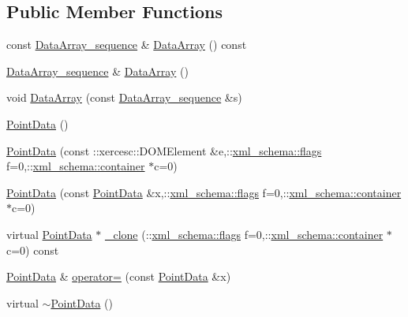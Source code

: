 \subsection*{Public Member Functions}
\begin{DoxyCompactItemize}
\item 
const \hyperlink{classPointData_acd882fa412789571fcaa2599ad2b2c71}{Data\+Array\+\_\+sequence} \& \hyperlink{classPointData_ac4d75ba2976d6acdaceb0b69f574e895}{Data\+Array} () const 
\item 
\hyperlink{classPointData_acd882fa412789571fcaa2599ad2b2c71}{Data\+Array\+\_\+sequence} \& \hyperlink{classPointData_aa8ff7ad5b2c1d99794d4b96e481138d2}{Data\+Array} ()
\item 
void \hyperlink{classPointData_a207059b73203faf8b3fec8659a9104e5}{Data\+Array} (const \hyperlink{classPointData_acd882fa412789571fcaa2599ad2b2c71}{Data\+Array\+\_\+sequence} \&s)
\item 
\hyperlink{classPointData_add74ef42ae2c48850449cd59e216111f}{Point\+Data} ()
\item 
\hyperlink{classPointData_ae0d2a9251b2690a28a04a96105874e45}{Point\+Data} (const \+::xercesc\+::\+D\+O\+M\+Element \&e,\+::\hyperlink{namespacexml__schema_a0612287d030cb2732d31a45b258fdc87}{xml\+\_\+schema\+::flags} f=0,\+::\hyperlink{namespacexml__schema_ada9aa30dc722e93ee2ed7243085402a5}{xml\+\_\+schema\+::container} $\ast$c=0)
\item 
\hyperlink{classPointData_a552557267dd3178a8e76be436b0709bc}{Point\+Data} (const \hyperlink{classPointData}{Point\+Data} \&x,\+::\hyperlink{namespacexml__schema_a0612287d030cb2732d31a45b258fdc87}{xml\+\_\+schema\+::flags} f=0,\+::\hyperlink{namespacexml__schema_ada9aa30dc722e93ee2ed7243085402a5}{xml\+\_\+schema\+::container} $\ast$c=0)
\item 
virtual \hyperlink{classPointData}{Point\+Data} $\ast$ \hyperlink{classPointData_aeb33ffedc35f8abc9ffd0d2f053c68ac}{\+\_\+clone} (\+::\hyperlink{namespacexml__schema_a0612287d030cb2732d31a45b258fdc87}{xml\+\_\+schema\+::flags} f=0,\+::\hyperlink{namespacexml__schema_ada9aa30dc722e93ee2ed7243085402a5}{xml\+\_\+schema\+::container} $\ast$c=0) const 
\item 
\hyperlink{classPointData}{Point\+Data} \& \hyperlink{classPointData_a3e175cdff950d602a53f4511df54abfd}{operator=} (const \hyperlink{classPointData}{Point\+Data} \&x)
\item 
virtual \hyperlink{classPointData_a53f701fd5abdb6105900c13f8282305e}{$\sim$\+Point\+Data} ()
\end{DoxyCompactItemize}
